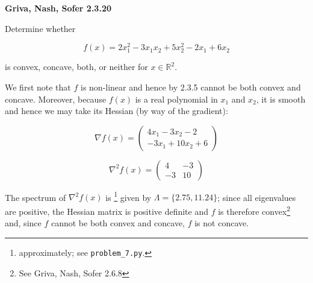\textbf{Griva, Nash, Sofer 2.3.20}

Determine whether

$$
  f(x) = 2x_1^2 - 3 x_1 x_2 + 5 x_2^2 - 2 x_1 + 6 x_2
$$

is convex, concave, both, or neither for $x \in \mathbb{R}^2$.

\begin{solution}
  We first note that $f$ is non-linear and hence by 2.3.5 cannot be both convex and concave.
  Moreover, because $f(x)$ is a real polynomial in $x_1$ and $x_2$, it is smooth and hence 
  we may take its Hessian (by way of the gradient):
  
  $$
    \nabla f(x) = \begin{pmatrix}
      4x_1 - 3x_2 - 2 \\
      -3x_1 + 10x_2 + 6
    \end{pmatrix}
  $$

  $$
    \nabla^2 f(x) = \begin{pmatrix}
      4  & -3 \\
      -3 & 10
    \end{pmatrix}
  $$

  The spectrum of $\nabla^2 f(x)$ is \footnote{
    approximately; see \texttt{problem\_7.py}.
  } given by $\Lambda = \{2.75, 11.24 \}$; since all eigenvalues are positive, 
  the Hessian matrix is positive definite and $f$ is therefore convex\footnote{
    See Griva, Nash, Sofer 2.6.8
  } and, since
  $f$ cannot be both convex and concave, $f$ is not concave.
  \ \\
\end{solution}